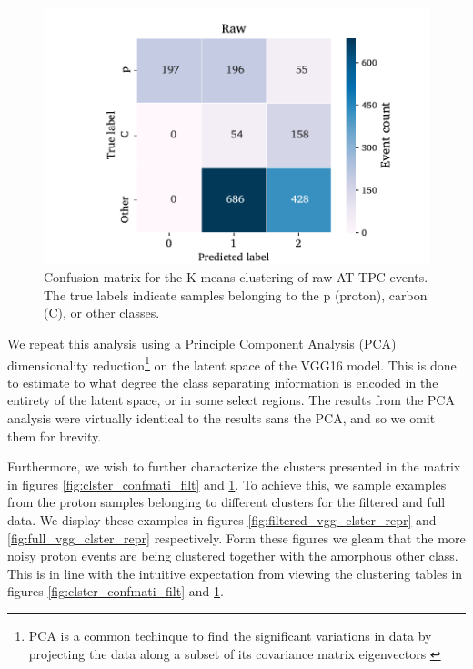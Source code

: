 \documentclass[review,number,sort&compress]{elsarticle}
\begin{document}
\begin{figure}
	\includegraphics[width=\textwidth]{custom_work/Rawvgg_conf_mat.pdf}
\caption[Pre-trained network - confusion matrices]{Confusion matrix for the K-means clustering of raw AT-TPC events. The true labels indicate samples belonging to the p (proton), carbon (C), or other classes. }\label{fig:clster_confmati_raw}
\end{figure}

We repeat this analysis using a Principle Component Analysis (PCA) dimensionality reduction\footnote{
PCA is a common techinque to find the significant variations in data by projecting the data along a subset of its covariance matrix eigenvectors \cite{Marsland2009}
} on the latent space of the VGG16 model. This is done to estimate to what degree the class separating information is encoded in the entirety of the latent space, or in some select regions. The results from the PCA analysis were virtually identical to the results sans the PCA, and so we omit them for brevity. 

Furthermore, we wish to further characterize the clusters presented in the matrix in figures \ref{fig:clster_confmati_filt} and \ref{fig:clster_confmati_raw}. To achieve this, we sample examples from the proton samples belonging to different clusters for the filtered and full data.
We display these examples in figures \ref{fig:filtered_vgg_clster_repr} and \ref{fig:full_vgg_clster_repr} respectively. Form these figures we gleam that the more noisy proton events are being clustered together with the amorphous other class. This is in line with the intuitive expectation from viewing the clustering tables in figures \ref{fig:clster_confmati_filt} and \ref{fig:clster_confmati_raw}.
\end{document}
